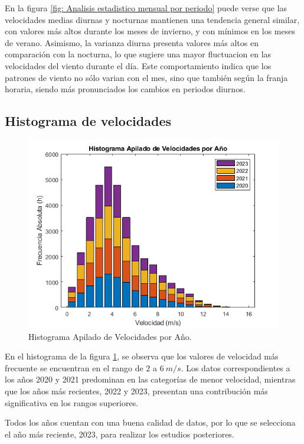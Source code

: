 \documentclass{IEEEtran}
\begin{document}
En la figura \ref{fig: Analisis estadistico mensual por periodo} puede verse que las velocidades medias diurnas y nocturnas mantienen una tendencia general similar, con valores más altos durante los meses de invierno, y con mínimos en los meses de verano. Asimismo, la varianza diurna presenta valores más altos en comparación con la nocturna, lo que sugiere una mayor fluctuacion en las velocidades del viento durante el día. Este comportamiento indica que los patrones de viento no sólo varian con el mes, sino que también según la franja horaria, siendo más pronunciados los cambios en periodos diurnos.

\subsection{Histograma de velocidades}

\begin{figure}[h]
    \centering
    \includegraphics[width = 0.5 \textwidth]{Imagenes/Histograma Apilado de Velocidades.png}
    \caption{Histograma Apilado de Velocidades por Año.}
    \label{fig: Histograma de velocidades}
\end{figure}

En el histograma de la figura \ref{fig: Histograma de velocidades}, se observa que los valores de velocidad más frecuente se encuentran en el rango de $2$ a $6\ m/s$. Los datos correspondientes a los años 2020 y 2021 predominan en las categorías de menor velocidad, mientras que los años más recientes, 2022 y 2023, presentan una contribución más significativa en los rangos superiores.

Todos los años cuentan con una buena calidad de datos, por lo que se selecciona el año más reciente, 2023, para realizar los estudios posteriores.
\end{document}
